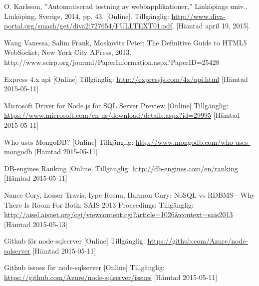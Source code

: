 \begin{thebibliography}{9}
O. Karlsson, ''Automatiserad testning av webbapplikationer,''
Linköpings univ., Linköping, Sverige, 2014, pp. 43.
[Online]. 
Tillgänglig: 
\url{http://www.diva-portal.org/smash/get/diva2:727654/FULLTEXT01.pdf}.
[Hämtad april 19, 2015].

 Wang Vanessa, Salim Frank, Moskovits Peter; The Definitive Guide to HTML5 WebSocket; New York City APress, 2013.
 http://www.scirp.org/journal/PaperInformation.aspx?PaperID=25428


Express 4.x api [Online] Tillgänglig: 
\url{http://expressjs.com/4x/api.html} [Hämtad 2015-05-11]

Microsoft Driver for Node.js for SQL Server Preview [Online] Tillgänglig: 
\url{https://www.microsoft.com/en-us/download/details.aspx?id=29995} [Hämtad 2015-05-11]

Who uses MongoDB? [Online] Tillgänglig: 
\url{http://www.mongodb.com/who-uses-mongodb} [Hämtad 2015-05-11]

DB-engines Ranking [Online] Tillgänglig: 
\url{http://db-engines.com/en/ranking} [Hämtad 2015-05-11]

 Nance Cory, Losser Travis, Iype Reenu, Harmon Gary; NoSQL vs RDBMS - Why There Is Room For Both; SAIS 2013 Proceedings; Tillgänglig: 
\url{http://aisel.aisnet.org/cgi/viewcontent.cgi?article=1026&context=sais2013} [Hämtad 2015-05-13]

Github för node-sqlserver [Online] Tillgänglig:  
\url{https://github.com/Azure/node-sqlserver} [Hämtad 2015-05-11]

Github issues för node-sqlserver [Online] Tillgänglig: 
\url{https://github.com/Azure/node-sqlserver/issues} [Hämtad 2015-05-11]

\end{thebibliography}
